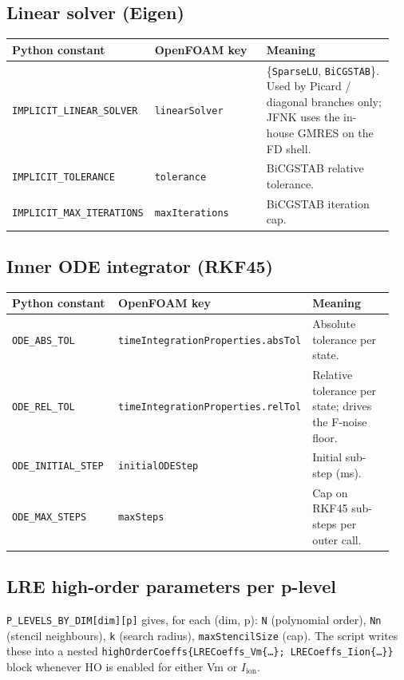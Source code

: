 \documentclass[11pt,a4paper]{article}
\newcommand{\Iion}{I_{\text{ion}}}
\newcommand{\code}[1]{\texttt{\small #1}}
\begin{document}
\subsection{Linear solver (Eigen)}
\begin{longtable}{@{}p{0.30\linewidth}p{0.30\linewidth}p{0.35\linewidth}@{}}
\toprule
Python constant & OpenFOAM key & Meaning \\
\midrule \endhead
\code{IMPLICIT\_LINEAR\_SOLVER} & \code{linearSolver} &
   \{\code{SparseLU}, \code{BiCGSTAB}\}. Used by Picard / diagonal
   branches only; JFNK uses the in-house GMRES on the FD shell. \\
\code{IMPLICIT\_TOLERANCE} & \code{tolerance} &
   BiCGSTAB relative tolerance. \\
\code{IMPLICIT\_MAX\_ITERATIONS} & \code{maxIterations} &
   BiCGSTAB iteration cap. \\
\bottomrule
\end{longtable}

\subsection{Inner ODE integrator (RKF45)}
\begin{longtable}{@{}p{0.30\linewidth}p{0.30\linewidth}p{0.35\linewidth}@{}}
\toprule
Python constant & OpenFOAM key & Meaning \\
\midrule \endhead
\code{ODE\_ABS\_TOL} & \code{timeIntegrationProperties.absTol} &
   Absolute tolerance per state. \\
\code{ODE\_REL\_TOL} & \code{timeIntegrationProperties.relTol} &
   Relative tolerance per state; drives the F-noise floor. \\
\code{ODE\_INITIAL\_STEP} & \code{initialODEStep} &
   Initial sub-step (ms). \\
\code{ODE\_MAX\_STEPS} & \code{maxSteps} &
   Cap on RKF45 sub-steps per outer call. \\
\bottomrule
\end{longtable}

\subsection{LRE high-order parameters per p-level}
\code{P\_LEVELS\_BY\_DIM[dim][p]} gives, for each (dim, p):
\code{N} (polynomial order), \code{Nn} (stencil neighbours),
\code{k} (search radius), \code{maxStencilSize} (cap). The script
writes these into a nested
\code{highOrderCoeffs\{LRECoeffs\_Vm\{\dots\}; LRECoeffs\_Iion\{\dots\}\}}
block whenever HO is enabled for either Vm or $\Iion$.
\end{document}
